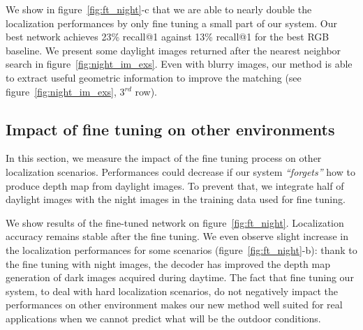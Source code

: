 We show in figure~\ref{fig:ft_night}-c that we are able to nearly double the localization performances by only fine tuning a small part of our system. Our best network achieves 23\% recall@1 against 13\% recall@1 for the best RGB baseline. We present some daylight images returned after the nearest neighbor search in figure~\ref{fig:night_im_exs}. Even with blurry images, our method is able to extract useful geometric information to improve the matching (see figure~\ref{fig:night_im_exs}, 3$^{rd}$ row).

\subsection{Impact of fine tuning on other environments}
\label{subsec:night2day_inf}
In this section, we measure the impact of the fine tuning process on other localization scenarios. Performances could decrease if our system \textit{``forgets''} how to produce depth map from daylight images. To prevent that, we integrate half of daylight images with the night images in the training data used for fine tuning. 

We show results of the fine-tuned network on figure~\ref{fig:ft_night}. Localization accuracy remains stable after the fine tuning. We even observe slight increase in the localization performances for some scenarios (figure~\ref{fig:ft_night}-b): thank to the fine tuning with night images, the decoder has improved the depth map generation of dark images acquired during daytime. The fact that fine tuning our system, to deal with hard localization scenarios, do not negatively impact the performances on other environment makes our new method well suited for real applications when we cannot predict what will be the outdoor conditions.



